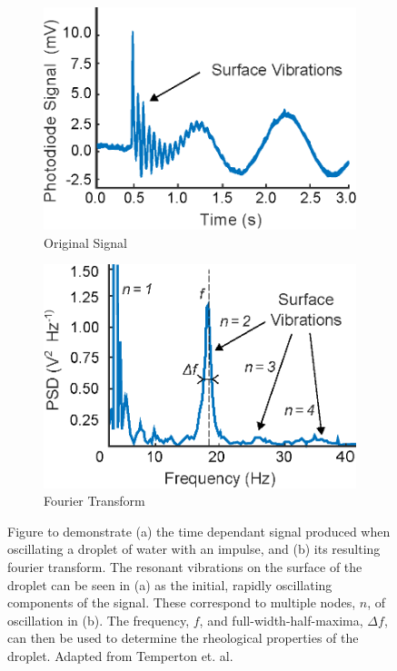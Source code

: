 \documentclass{physics_article_B}
\begin{document}
        \begin{figure}[H]
            \centering
                \begin{subfigure}[b]{0.48\textwidth}\hspace*{-1cm}\includegraphics[width=\textwidth]{Figures/TempertonSignal.eps}
                    \caption{Original Signal}
                    \label{fig:temperton:signal}
                \end{subfigure}\hspace{3pt}
                \begin{subfigure}[b]{0.48\textwidth}\hspace*{-0.5cm}\includegraphics[width=\textwidth]{Figures/TempertonSignalPD.eps}
                    \caption{Fourier Transform}
                    \label{fig:temperton:PD}
                \end{subfigure}
            \caption{Figure to demonstrate (a) the time dependant signal produced when oscillating a droplet of water with an impulse, and (b) its resulting fourier transform. The resonant vibrations on the surface of the droplet can be seen in (a) as the initial, rapidly oscillating components of the signal. These correspond to multiple nodes, $n$, of oscillation in (b). The frequency, $f$, and full-width-half-maxima, $\Delta f$, can then be used to determine the rheological properties of the droplet. Adapted from Temperton et. al.\cite{tempertonphd}}\label{fig:temperton}
        \end{figure}
\end{document}
